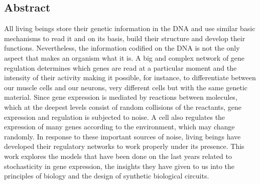 \documentclass[12pt,letterpaper,twoside,openright]{report}
\begin{document}
\subsection*{Abstract}
\vspace{-0.5cm}
\begin{singlespacing}
All living beings store their genetic information in the DNA and use similar basic mechanisms to read it and on its basis, build their structure and develop their functions. Nevertheless, the information codified on the DNA is not the only aspect that makes an organism what it is. A big and complex network of gene regulation determines which genes are read at a particular moment and the intensity of their activity making it possible, for instance, to differentiate between our muscle cells and our neurons, very different cells but with the same genetic material. Since gene expression is mediated by reactions between molecules, which at the deepest levels consist of random collisions of the reactants, gene expression and regulation is subjected to noise. A cell also regulates the expression of many genes according to the environment, which may change randomly. In response to these important sources of noise, living beings have developed their regulatory networks to work properly under its presence. This work explores the models that have been done on the last years related to stochasticity in gene expression, the insights they have given to us into the principles of biology and the design of synthetic biological circuits.\par
\end{singlespacing}
\vspace{0.5cm}
\newpage
\tableofcontents
{}
\newpage
\listoffigures
\newpage
\listoftables

\raggedbottom






\cite{thattai01} \cite{kaern05} \cite{elowitz02} \cite{pedraza05} \cite{paulsson05} \cite{alon99} \cite{arkin98} \cite{pedraza08} \cite{huh11a} \cite{huh11b} \cite{gillespie77} \cite{paulsson04} \cite{bertsekas08} \cite{vankampen92} \cite{gardiner03}
\printbibliography
{}
\end{document}
